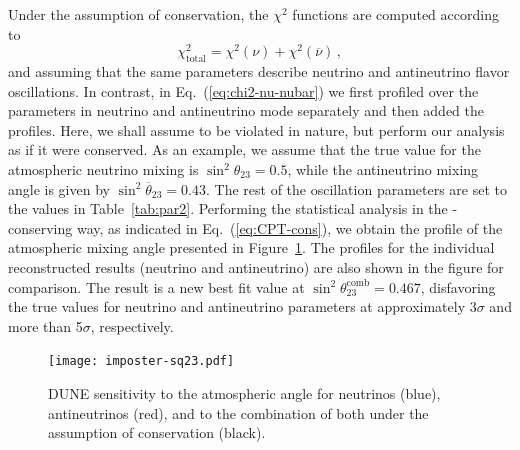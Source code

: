 Under the assumption of  conservation, the $\chi^2$ functions are computed according to
%
\begin{equation}
 \chi^2_{\text{total}}=\chi^2(\nu)+\chi^2(\overline{\nu})\, ,
 \label{eq:CPT-cons}
\end{equation}
%
and assuming that the same parameters describe neutrino and antineutrino flavor oscillations. In contrast, in Eq.~(\ref{eq:chi2-nu-nubar}) we first profiled over the parameters in neutrino and antineutrino mode separately and then added the profiles. Here, we shall assume  to be violated in nature, but perform our analysis as if it were conserved. As an example, we assume that the true value for the atmospheric neutrino mixing is $\sin^2\theta_{23}=0.5$, while the antineutrino mixing angle is given by $\sin^2\overline{\theta}_{23}=0.43$. The rest of the oscillation parameters are set to the values in Table~\ref{tab:par2}. Performing the statistical analysis in the -conserving way, as indicated in Eq.~(\ref{eq:CPT-cons}), we obtain the profile of the atmospheric mixing angle presented in Figure~\ref{fig:imposter-sq23}. The profiles for the individual reconstructed results (neutrino and antineutrino) are also shown in the figure for comparison.
The result is a new best fit value at $\sin^2\theta^\text{comb}_{23}=0.467$, disfavoring the true values for neutrino and antineutrino parameters at approximately 3$\sigma$ and more than 5$\sigma$, respectively. 

\begin{figure}[!htb]
 \centering
        \texttt{[image: imposter-sq23.pdf]}
        \caption[Sensitivity to $\theta_{23}$ for (anti)neutrinos, and combination under CPT conservation]{DUNE sensitivity to the atmospheric angle for neutrinos (blue), antineutrinos (red), and to the combination of both under the assumption of  conservation (black).
         }
	\label{fig:imposter-sq23}
\end{figure}

